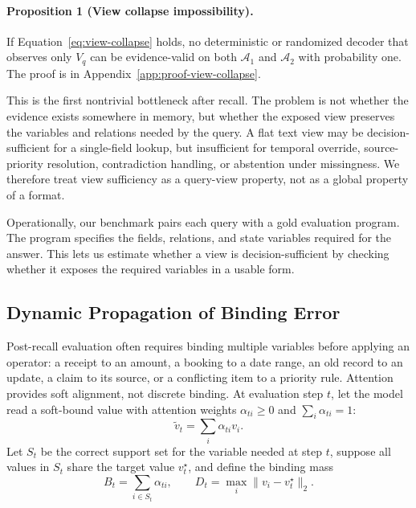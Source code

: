 \paragraph{Proposition 1 (View collapse impossibility).}
If Equation~\ref{eq:view-collapse} holds, no deterministic or randomized decoder that observes only $V_q$ can be evidence-valid on both $\mathcal A_1$ and $\mathcal A_2$ with probability one.
The proof is in Appendix~\ref{app:proof-view-collapse}.

This is the first nontrivial bottleneck after recall.
The problem is not whether the evidence exists somewhere in memory, but whether the exposed view preserves the variables and relations needed by the query.
A flat text view may be decision-sufficient for a single-field lookup, but insufficient for temporal override, source-priority resolution, contradiction handling, or abstention under missingness.
We therefore treat view sufficiency as a query-view property, not as a global property of a format.

Operationally, our benchmark pairs each query with a gold evaluation program.
The program specifies the fields, relations, and state variables required for the answer.
This lets us estimate whether a view is decision-sufficient by checking whether it exposes the required variables in a usable form.

\subsection{Dynamic Propagation of Binding Error}
\label{subsec:dynamic-binding}

Post-recall evaluation often requires binding multiple variables before applying an operator: a receipt to an amount, a booking to a date range, an old record to an update, a claim to its source, or a conflicting item to a priority rule.
Attention provides soft alignment, not discrete binding.
At evaluation step $t$, let the model read a soft-bound value with attention weights $\alpha_{ti}\ge0$ and $\sum_i\alpha_{ti}=1$:
\begin{equation}
\tilde v_t=\sum_i \alpha_{ti}v_i .
\label{eq:soft-bound-value}
\end{equation}
Let $S_t$ be the correct support set for the variable needed at step $t$, suppose all values in $S_t$ share the target value $v_t^\star$, and define the binding mass
\begin{equation}
B_t=\sum_{i\in S_t}\alpha_{ti},
\qquad
D_t=\max_i\lVert v_i-v_t^\star\rVert_2 .
\label{eq:binding-mass}
\end{equation}

